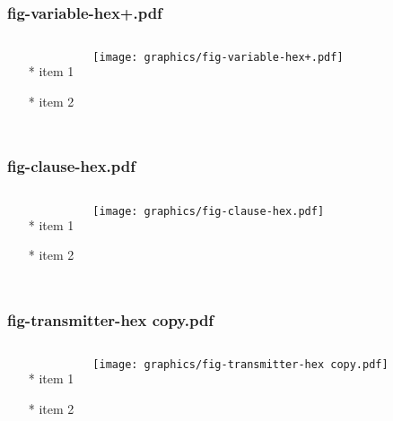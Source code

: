 \documentclass{beamer}
\begin{document}
\begin{frame} \frametitle{fig-variable-hex+.pdf}
    \begin{columns}[c]
        \begin{itemize}
            \item[*] item 1
            \item[*] item 2
        \end{itemize}
        \begin{minipage}{\linewidth}
            \begin{center}
            \texttt{[image: graphics/fig-variable-hex+.pdf]}
            \label{gfx:fig-variable-hex+.pdf}
            \end{center}
        \end{minipage}
    \end{columns}
\end{frame}

\begin{frame} \frametitle{fig-clause-hex.pdf}
    \begin{columns}[c]
        \begin{itemize}
            \item[*] item 1
            \item[*] item 2
        \end{itemize}
        \begin{minipage}{\linewidth}
            \begin{center}
            \texttt{[image: graphics/fig-clause-hex.pdf]}
            \label{gfx:fig-clause-hex.pdf}
            \end{center}
        \end{minipage}
    \end{columns}
\end{frame}

\begin{frame} \frametitle{fig-transmitter-hex copy.pdf}
    \begin{columns}[c]
        \begin{itemize}
            \item[*] item 1
            \item[*] item 2
        \end{itemize}
        \begin{minipage}{\linewidth}
            \begin{center}
            \texttt{[image: graphics/fig-transmitter-hex copy.pdf]}
            \label{gfx:fig-transmitter-hex copy.pdf}
            \end{center}
        \end{minipage}
    \end{columns}
\end{frame}
\end{document}
